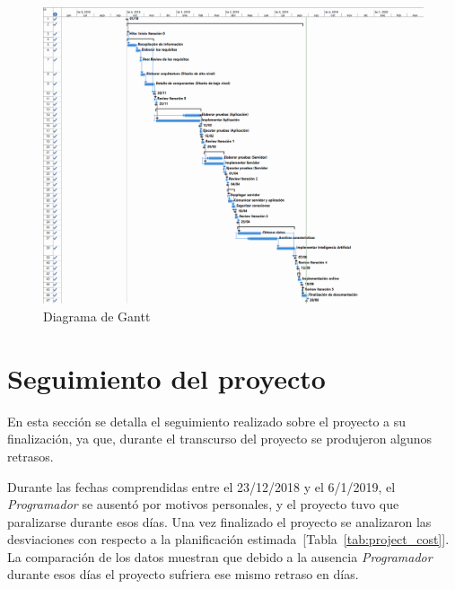 \begin{landscape}
    \begin{figure}
        \centering
        \includegraphics[width=\linewidth, height=0.9\textheight]{imaxes/project/gantt.png}
        \caption{Diagrama de Gantt}
        \label{fig:gantt}
    \end{figure}
\end{landscape}


\section{Seguimiento del proyecto}

En esta sección se detalla el seguimiento realizado sobre el proyecto a su finalización, ya que, durante el transcurso del proyecto se produjeron algunos retrasos.

Durante las fechas comprendidas entre el 23/12/2018 y el 6/1/2019, el \textit{Programador} se ausentó por motivos personales, y el proyecto tuvo que paralizarse durante esos días.
Una vez finalizado el proyecto se analizaron las desviaciones con respecto a la planificación estimada~[Tabla~\ref{tab:project_cost}]. La comparación de los datos muestran que debido a la ausencia \textit{Programador} durante esos días el proyecto sufriera ese mismo retraso en días.

